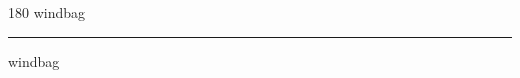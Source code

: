 
\begin{frame}
\begin{center}
\begin{turn}{180}
{\fontsize{2.5cm}{1em}\selectfont windbag}
\end{turn}
\vspace{1em}\par  
\hrule
\vspace{1em}\par  
{\fontsize{2.5cm}{1em}\selectfont windbag}
\end{center}
\end{frame}
